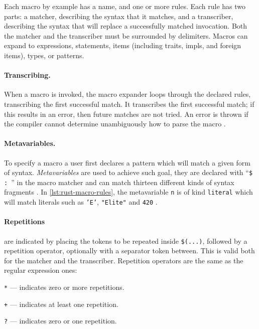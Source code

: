 \begin{displayquote}
    Each macro by example has a name, and one or more rules.
    Each rule has two parts: a matcher, describing the syntax that it matches, and a transcriber,
    describing the syntax that will replace a successfully matched invocation.
    Both the matcher and the transcriber must be surrounded by delimiters.
    Macros can expand to expressions, statements, items
    (including traits, impls, and foreign items), types, or patterns.
\end{displayquote}

\paragraph{Transcribing.}
When a macro is invoked, the macro expander loops through the declared rules, transcribing the first successful match.
It transcribes the first successful match; if this results in an error, then future matches are not tried.
An error is thrown if the compiler cannot determine unambiguously how to parse the macro
\autocite[Section 3.1 - Transcribing]{RustRef2021}.

\paragraph{Metavariables.}
To specify a macro a user first declares a pattern which will match a given form of syntax.
\emph{Metavariables} are used to achieve such goal,
they are declared with “\texttt{\$  : }” in the macro matcher and
can match thirteen different kinds of syntax fragments \autocite[Section 3.1 - Metavariables]{RustRef2021}.
In \autoref{lst:rust-macro-rules}, the metavariable \texttt{n} is of kind \texttt{literal}
which will match literals such as \texttt{'E'}, \texttt{"Elite"} and \texttt{420} \autocite[Section 8.2.1]{RustRef2021}.

\paragraph{Repetitions} are indicated by placing the tokens to be repeated inside \texttt{\$(...)},
followed by a repetition operator, optionally with a separator token between.
This is valid both for the matcher and the transcriber.
Repetition operators are the same as the regular expression ones:
\begin{compactitem}
    \item \texttt{*} — indicates zero or more repetitions.
    \item \texttt{+} — indicates at least one repetition.
    \item \texttt{?} — indicates zero or one repetition.
\end{compactitem}

